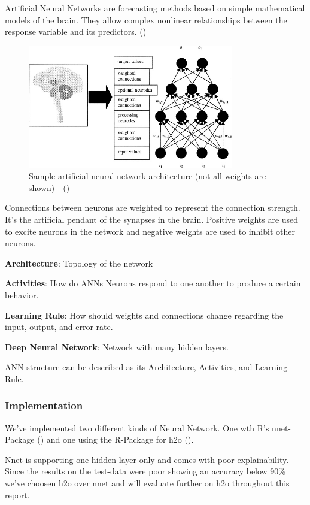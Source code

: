 \documentclass[]{article}
\begin{document}
Artificial Neural Networks are forecasting methods based on simple
mathematical models of the brain. They allow complex nonlinear
relationships between the response variable and its predictors.
(\cite{otexts})

\begin{figure}
    \centering
    \includegraphics[width=0.8\textwidth]{images/ann.jpg}
    \caption{Sample artificial neural network architecture (not all weights are shown) - (\cite{ann})}
    \label{fig:ann}
\end{figure}

Connections between neurons are weighted to represent the connection
strength. It's the artificial pendant of the synapses in the brain.
Positive weights are used to excite neurons in the network and negative
weights are used to inhibit other neurons.

\textbf{Architecture}: Topology of the network

\textbf{Activities}: How do ANNs Neurons respond to one another to
produce a certain behavior.

\textbf{Learning Rule}: How should weights and connections change
regarding the input, output, and error-rate.

\textbf{Deep Neural Network}: Network with many hidden layers.

ANN structure can be described as its Architecture, Activities, and
Learning Rule.

\subsubsection{Implementation}\label{implementation}

We've implemented two different kinds of Neural Network. One wth R's
nnet-Package (\cite{nnet}) and one using the R-Package for h2o
(\cite{h2o}).

Nnet is supporting one hidden layer only and comes with poor
explainability. Since the results on the test-data were poor showing an
accuracy below 90\% we've choosen h2o over nnet and will evaluate
further on h2o throughout this report.
\end{document}
